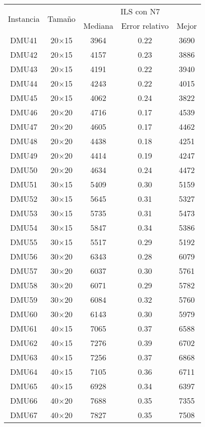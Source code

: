 \begin{table}[H]
\centering
\begin{tabular}{@{}ccccc@{}}
\toprule
\multirow{2}{*}{Instancia} & \multirow{2}{*}{Tamaño} & \multicolumn{3}{c}{ILS con N7}  \\ \cmidrule(lr){3-5}
& & Mediana& Error relativo & Mejor  \\ \midrule
DMU41 & 20$\times$15 & 3964 & 0.22 & 3690\\ 
DMU42 & 20$\times$15 & 4157 & 0.23 & 3886\\ 
DMU43 & 20$\times$15 & 4191 & 0.22 & 3940\\ 
DMU44 & 20$\times$15 & 4243 & 0.22 & 4015\\ 
DMU45 & 20$\times$15 & 4062 & 0.24 & 3822\\ 
DMU46 & 20$\times$20 & 4716 & 0.17 & 4539\\ 
DMU47 & 20$\times$20 & 4605 & 0.17 & 4462\\ 
DMU48 & 20$\times$20 & 4438 & 0.18 & 4251\\ 
DMU49 & 20$\times$20 & 4414 & 0.19 & 4247\\ 
DMU50 & 20$\times$20 & 4634 & 0.24 & 4472\\ 
DMU51 & 30$\times$15 & 5409 & 0.30 & 5159\\ 
DMU52 & 30$\times$15 & 5645 & 0.31 & 5327\\ 
DMU53 & 30$\times$15 & 5735 & 0.31 & 5473\\ 
DMU54 & 30$\times$15 & 5847 & 0.34 & 5386\\ 
DMU55 & 30$\times$15 & 5517 & 0.29 & 5192\\ 
DMU56 & 30$\times$20 & 6343 & 0.28 & 6079\\ 
DMU57 & 30$\times$20 & 6037 & 0.30 & 5761\\ 
DMU58 & 30$\times$20 & 6071 & 0.29 & 5782\\ 
DMU59 & 30$\times$20 & 6084 & 0.32 & 5760\\ 
DMU60 & 30$\times$20 & 6143 & 0.30 & 5979\\ 
DMU61 & 40$\times$15 & 7065 & 0.37 & 6588\\ 
DMU62 & 40$\times$15 & 7276 & 0.39 & 6702\\ 
DMU63 & 40$\times$15 & 7256 & 0.37 & 6868\\ 
DMU64 & 40$\times$15 & 7105 & 0.36 & 6711\\ 
DMU65 & 40$\times$15 & 6928 & 0.34 & 6397\\ 
DMU66 & 40$\times$20 & 7688 & 0.35 & 7355\\ 
DMU67 & 40$\times$20 & 7827 & 0.35 & 7508\\ 

\end{tabular}
\end{table}
